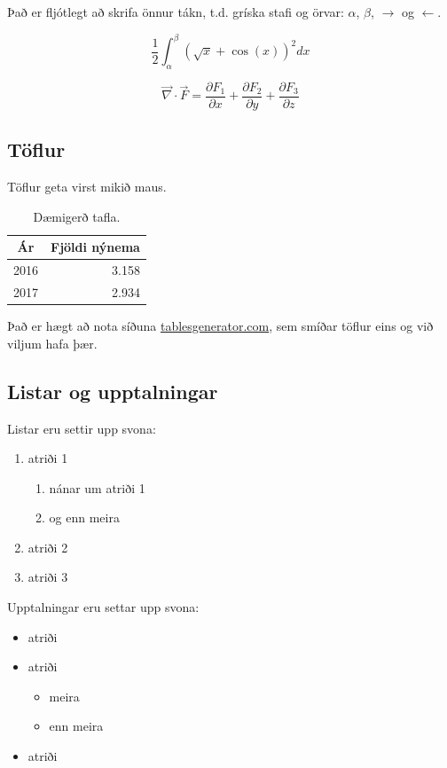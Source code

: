 \documentclass[a4paper, 12pt]{article}
\begin{document}
Það er fljótlegt að skrifa önnur tákn, t.d. gríska stafi og örvar: $\alpha$, $\beta$, $\rightarrow$ og $\leftarrow$.

$$ \frac{1}{2}\int_\alpha^\beta (\sqrt{x}+\cos(x))^2dx $$

$$\vec{\nabla}\cdot \vec{F}= \frac{\partial F_1}{\partial x}+\frac{\partial F_2}{\partial y}+\frac{\partial F_3}{\partial z}$$

\subsection{Töflur}
Töflur geta virst mikið maus. 
\begin{table}[H] %
\centering
\begin{tabular}{c|r} %
Ár & Fjöldi nýnema \\ \hline
2016 & 3.158 \\
2017 & 2.934
\end{tabular}
\caption{\label{tafla:nynemar}Dæmigerð tafla.} %
\end{table}

Það er hægt að nota síðuna \href{https://www.tablesgenerator.com}{tablesgenerator.com}, sem smíðar töflur eins og við viljum hafa þær.

\subsection{Listar og upptalningar}
Listar eru settir upp svona: 
\begin{enumerate}
\item atriði 1
\begin{enumerate}
\item nánar um atriði 1
\item og enn meira
\end{enumerate}
\item atriði 2
\item atriði 3
\end{enumerate}

Upptalningar eru settar upp svona:

\begin{itemize}
\item atriði
\item atriði
\begin{itemize}
\item meira
\item enn meira
\end{itemize}
\item atriði
\end{itemize}
\end{document}
